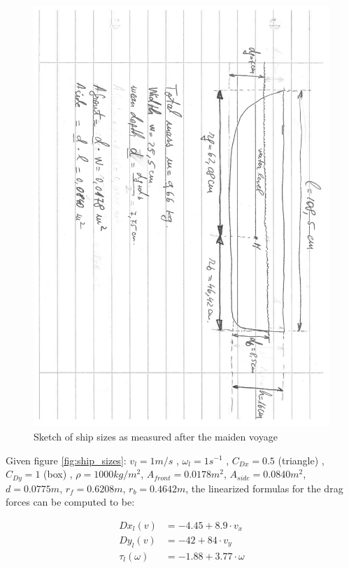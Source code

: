 \begin{figure}[htbp]
	\centering
	\includegraphics[width=\textwidth, trim=1.8cm 0cm 0cm 2cm, clip = true, angle = 90, width=\textwidth]{img/ship_sizes}
	\caption{Sketch of ship sizes as measured after the maiden voyage}
	\label{fig:ship_sizes}
\end{figure}

Given figure \vref{fig:ship_sizes}:
 $ v_{l} = 1m/s $ , \quad
 $ \omega_{l} = 1 s ^{-1} $ ,\quad
 $ C_{Dx} = 0.5 $ (triangle) ,\quad
 $ C_{Dy} = 1 $ (box) ,\quad
 $ \rho = 1000 kg/m ^{2} $,\quad
 $ A_{front} = 0.0178 m^{2} $,\quad
 $ A_{side} = 0.0840 m ^{2} $,\quad
 $ d = 0.0775 m $,\quad
 $ r_{f} = 0.6208 m $,\quad
 $ r_{b} = 0.4642 m $,\quad
the linearized formulas for the drag forces can be computed to be:


\begin{align}
 Dx_{l}(v) &= -4.45 + 8.9 \cdot v_{x} \\
 Dy_{l}(v) &= -42 + 84 \cdot v_{y} \\
 \tau_{l}(\omega) &= -1.88 + 3.77 \cdot \omega
\end{align}


